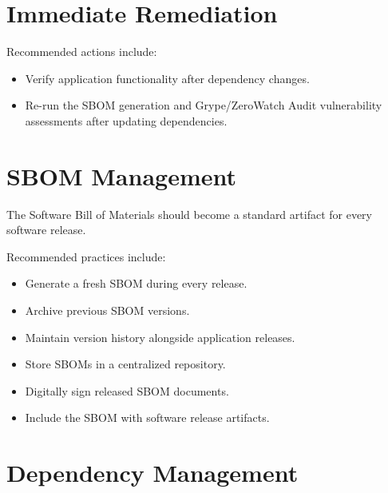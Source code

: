\section{Immediate Remediation}


Recommended actions include:
\begin{itemize}
\item Verify application functionality after dependency changes.
\item Re-run the SBOM generation and Grype/ZeroWatch Audit vulnerability assessments after updating dependencies.
\end{itemize}

\vspace{0.4cm}


\section{SBOM Management}

The Software Bill of Materials should become a standard artifact for every software release.

Recommended practices include:
\begin{itemize}
\item Generate a fresh SBOM during every release.
\item Archive previous SBOM versions.
\item Maintain version history alongside application releases.
\item Store SBOMs in a centralized repository.
\item Digitally sign released SBOM documents.
\item Include the SBOM with software release artifacts.
\end{itemize}

\vspace{0.4cm}


\section{Dependency Management}


